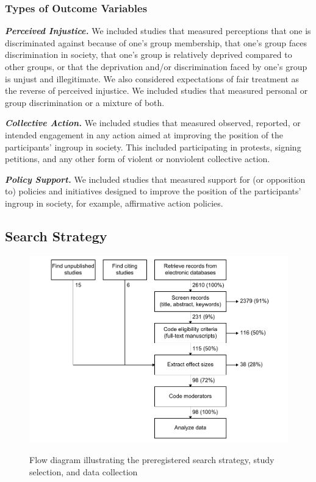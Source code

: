 \documentclass[12pt, letterpaper]{article}
\begin{document}
\hypertarget{types-of-outcome-variables}{%
\subsubsection{Types of Outcome
Variables}\label{types-of-outcome-variables}}

\textbf{\emph{Perceived Injustice.}} We included studies that measured
perceptions that one is discriminated against because of one's group
membership, that one's group faces discrimination in society, that one's
group is relatively deprived compared to other groups, or that the
deprivation and/or discrimination faced by one's group is unjust and
illegitimate. We also considered expectations of fair treatment as the
reverse of perceived injustice. We included studies that measured
personal or group discrimination or a mixture of both.

\textbf{\emph{Collective Action.}} We included studies that measured
observed, reported, or intended engagement in any action aimed at
improving the position of the participants' ingroup in society. This
included participating in protests, signing petitions, and any other
form of violent or nonviolent collective action.

\textbf{\emph{Policy Support.}} We included studies that measured
support for (or opposition to) policies and initiatives designed to
improve the position of the participants' ingroup in society, for
example, affirmative action policies.

\hypertarget{search-strategy}{%
\subsection{Search Strategy}\label{search-strategy}}

\begin{figure}[t!]
\centering
\caption{Flow diagram illustrating the preregistered search strategy, study selection, and data collection}
\includegraphics[scale=1]{../figures/figure-1}
\label{fig:f1}
\end{figure}
\end{document}
